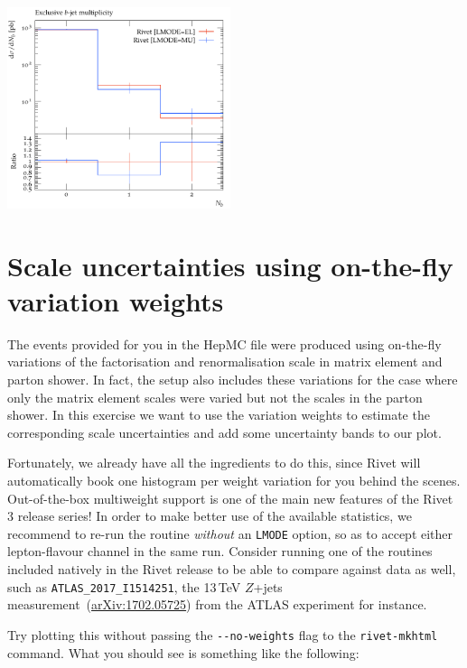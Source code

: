\documentclass[10pt,fleqn]{scrartcl}
\theoremstyle{exstyle}
\begin{document}
\begin{center}
\includegraphics[width=0.49\textwidth]{figures/bjets_excl.pdf}
\end{center}

\section{Scale uncertainties using on-the-fly variation weights}

The events provided for you in the HepMC file were produced using on-the-fly variations
of the factorisation and renormalisation scale in matrix element and parton shower.
In fact, the setup also includes these variations for the case where only the matrix element
scales were varied but not the scales in the parton shower.
In this exercise we want to use the variation weights to estimate the 
corresponding scale uncertainties and add some uncertainty bands to our plot.

Fortunately, we already have all the ingredients to do this, since Rivet will
automatically book one histogram per weight variation for you behind the scenes.
Out-of-the-box multiweight support is one of the main new features of the Rivet 3 release series!
In order to make better use of the available statistics, we recommend to re-run the routine
\emph{without} an \verb|LMODE| option, so as to accept either lepton-flavour channel 
in the same run. Consider running one of the routines included natively in the Rivet 
release to be able to compare against data as well, such as \verb|ATLAS_2017_I1514251|,
the 13\,TeV $Z$+jets measurement~(\href{https://arxiv.org/abs/1702.05725}{arXiv:1702.05725}) 
from the ATLAS experiment for instance.

Try plotting this without passing the \verb|--no-weights| flag to the \verb|rivet-mkhtml| command.
What you should see is something like the following:
\end{document}
